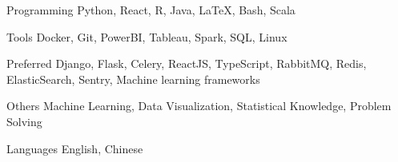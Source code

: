 

\begin{cvskills}

  \cvskill
    {Programming} %
    {Python, React, R, Java, LaTeX, Bash, Scala} %

  \cvskill
    {Tools} %
    {Docker, Git, PowerBI, Tableau, Spark, SQL, Linux} %

  \cvskill
    {Preferred} %
    {Django, Flask, Celery, ReactJS, TypeScript, RabbitMQ, Redis, ElasticSearch, Sentry, Machine learning frameworks } %

  \cvskill
    {Others} %
    {Machine Learning, Data Visualization, Statistical Knowledge, Problem Solving} %
    
  \cvskill
    {Languages} %
    {English, Chinese} %

\end{cvskills}